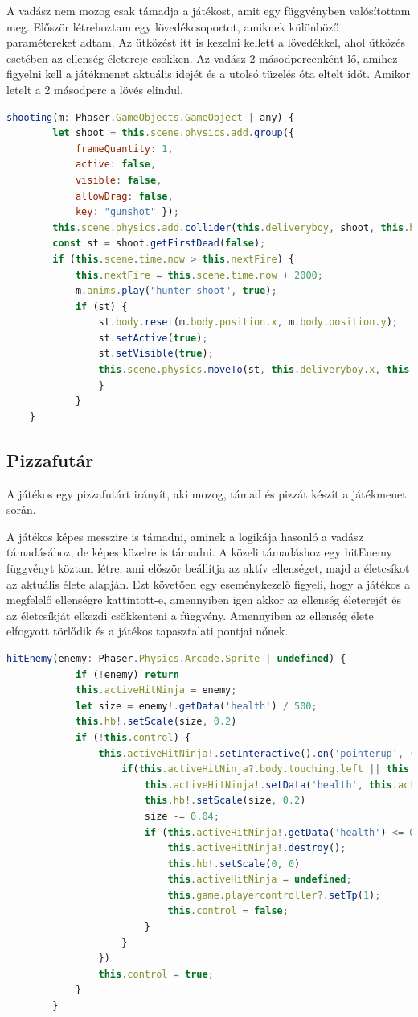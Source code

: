 \documentclass[12pt, a4paper]{report}
\theoremstyle{definition}
\begin{document}
	A vadász nem mozog csak támadja a játékost, amit egy függvényben valósítottam meg. Először létrehoztam egy lövedékcsoportot, amiknek különböző paramétereket adtam. Az ütközést itt is kezelni kellett a lövedékkel, ahol ütközés esetében az ellenség életereje csökken. Az vadász 2 másodpercenként lő, amihez figyelni kell a játékmenet aktuális idejét és a utolsó tüzelés óta eltelt időt. Amikor letelt a 2 másodperc a lövés elindul.
	\begin{lstlisting}[language=JavaScript]
	shooting(m: Phaser.GameObjects.GameObject | any) {
		let shoot = this.scene.physics.add.group({ 
			frameQuantity: 1,
			active: false,
			visible: false,
			allowDrag: false,
			key: "gunshot" });
		this.scene.physics.add.collider(this.deliveryboy, shoot, this.hitPlayer, undefined, this)
		const st = shoot.getFirstDead(false);
		if (this.scene.time.now > this.nextFire) {
			this.nextFire = this.scene.time.now + 2000;
			m.anims.play("hunter_shoot", true);
			if (st) {
				st.body.reset(m.body.position.x, m.body.position.y);
				st.setActive(true);
				st.setVisible(true);
				this.scene.physics.moveTo(st, this.deliveryboy.x, this.deliveryboy.y, 900)
				}
			}
	}
	\end{lstlisting}
	\subsection{Pizzafutár}
	A játékos egy pizzafutárt irányít, aki mozog, támad és pizzát készít a játékmenet során.
	
	A játékos képes messzire is támadni, aminek a logikája hasonló a vadász támadásához, de képes közelre is támadni. A közeli támadáshoz egy hitEnemy függvényt köztam létre, ami először beállítja az aktív ellenséget, majd a életcsíkot az aktuális élete alapján. Ezt követően egy eseménykezelő figyeli, hogy a játékos a megfelelő ellenségre kattintott-e, amennyiben igen akkor az ellenség életerejét és az életcsíkját elkezdi csökkenteni a függvény. Amennyiben az ellenség élete elfogyott törlődik és a játékos tapasztalati pontjai nőnek.
	\begin{lstlisting}[language=JavaScript]
		hitEnemy(enemy: Phaser.Physics.Arcade.Sprite | undefined) {
			if (!enemy) return
			this.activeHitNinja = enemy;
			let size = enemy!.getData('health') / 500;
			this.hb!.setScale(size, 0.2)
			if (!this.control) {
				this.activeHitNinja!.setInteractive().on('pointerup', () => {
					if(this.activeHitNinja?.body.touching.left || this.activeHitNinja?.body.touching.right){
						this.activeHitNinja!.setData('health', this.activeHitNinja!.getData('health') - 20)
						this.hb!.setScale(size, 0.2)
						size -= 0.04;
						if (this.activeHitNinja!.getData('health') <= 0) {
							this.activeHitNinja!.destroy();
							this.hb!.setScale(0, 0)
							this.activeHitNinja = undefined;
							this.game.playercontroller?.setTp(1);
							this.control = false;
						}
					}
				})
				this.control = true;
			}
		}
	\end{lstlisting}
\end{document}

